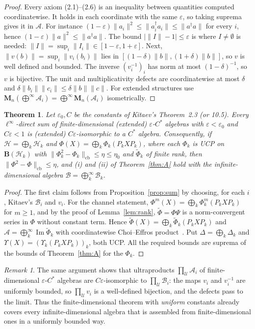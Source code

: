 \documentclass[11pt]{article}
\newtheorem{theorem}{Theorem}
\theoremstyle{remark}
\newtheorem{remark}[proposition]{Remark}
\newcommand{\eps}{\varepsilon}
\newcommand{\cA}{\mathcal{A}}
\newcommand{\cB}{\mathcal{B}}
\newcommand{\cH}{\mathcal{H}}
\newcommand{\Bo}{\mathbf{B}}
\newcommand{\cb}{\mathrm{cb}}
\newcommand{\Img}{\operatorname{Im}}
\newcommand{\wt}{\widetilde}
\newcommand{\Ma}[1]{\mathbf{M}_{#1}}
\begin{document}
\begin{proof}
Every axiom (2.1)--(2.6) is an inequality between quantities computed coordinatewise. It holds in each coordinate with the same $\eps$, so taking suprema gives it in $\cA$. For instance $(1-\eps)\|a_i\|^2\le\|a_i^\dagger a_i\|\le\|a^\dagger a\|$ for every $i$, hence $(1-\eps)\|a\|^2\le\|a^\dagger a\|$. The bound $|\|I\|-1|\le\eps$ is where $I\ne\emptyset$ is needed: $\|I\|=\sup_i\|I_i\|\in[1-\eps,1+\eps]$. Next, $\|v(b)\|=\sup_i\|v_i(b_i)\|$ lies in $[(1-\delta)\|b\|,(1+\delta)\|b\|]$, so $v$ is well defined and bounded. The inverse $(v_i^{-1})_i$ has norm at most $(1-\delta)^{-1}$, so $v$ is bijective. The unit and multiplicativity defects are coordinatewise at most $\delta$ and $\delta\|b_i\|\|c_i\|\le\delta\|b\|\|c\|$. For extended structures use $\Ma{n}(\bigoplus^\infty\cA_i)=\bigoplus^\infty\Ma{n}(\cA_i)$ isometrically.
\end{proof}

\begin{theorem}\label{thm:B}
Let $\eps_0,C$ be the constants of Kitaev's Theorem~2.3 (or 10.5). Every $\ell^\infty$-direct sum of finite-dimensional (extended) $\eps$-$C^*$ algebras with $\eps<\eps_0$ and $C\eps<1$ is (extended) $C\eps$-isomorphic to a $C^*$ algebra. Consequently, if $\cH=\bigoplus_k\cH_k$ and $\Phi(X)=\bigoplus_k\Phi_k(P_kXP_k)$, where each $\Phi_k$ is UCP on $\Bo(\cH_k)$ with $\|\Phi_k^2-\Phi_k\|_\cb\le\eta\le\eta_0$ and $\wt\Phi_k$ of finite rank, then $\|\Phi^2-\Phi\|_\cb\le\eta$, and (i) and (ii) of Theorem~\ref{thm:A} hold with the infinite-dimensional algebra $\cB=\bigoplus^\infty_k\cB_k$.
\end{theorem}

\begin{proof}
The first claim follows from Proposition~\ref{prop:sum} by choosing, for each $i$, Kitaev's $\cB_i$ and $v_i$. For the channel statement, $\Phi^m(X)=\bigoplus_k\Phi_k^m(P_kXP_k)$ for $m\ge1$, and by the proof of Lemma~\ref{lem:rank}, $\wt\Phi=\Phi\Psi$ is a norm-convergent series in $\Phi$ without constant term. Hence $\wt\Phi(X)=\bigoplus_k\wt\Phi_k(P_kXP_k)$ and $\cA=\bigoplus^\infty_k\Img\wt\Phi_k$ with coordinatewise Choi--Effros product~\cite{ChoiEffros}. Put $\Delta=\bigoplus_k\Delta_k$ and $\Upsilon(X)=(\Upsilon_k(P_kXP_k))_k$, both UCP. All the required bounds are suprema of the bounds of Theorem~\ref{thm:A} for the $\Phi_k$.
\end{proof}

\begin{remark}
The same argument shows that ultraproducts $\prod_\mathcal{U}\cA_i$ of finite-dimensional $\eps$-$C^*$ algebras are $C\eps$-isomorphic to $\prod_\mathcal{U}\cB_i$: the maps $v_i$ and $v_i^{-1}$ are uniformly bounded, so $\prod_\mathcal{U}v_i$ is a well-defined bijection, and the defects pass to the limit. Thus the finite-dimensional theorem with \emph{uniform} constants already covers every infinite-dimensional algebra that is assembled from finite-dimensional ones in a uniformly bounded way.
\end{remark}
\end{document}
